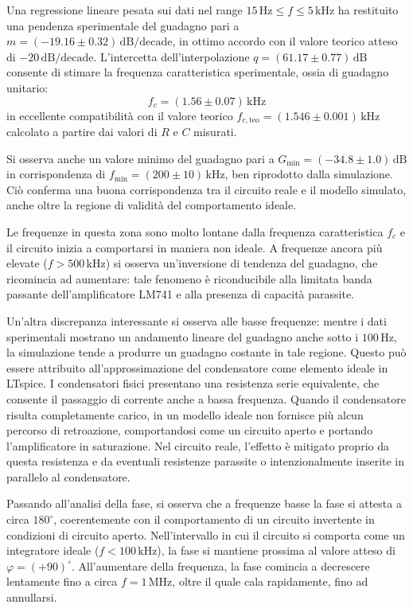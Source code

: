 \documentclass[a4paper,12pt]{article}
\begin{document}
Una regressione lineare pesata sui dati nel range \(15\,\mathrm{Hz} \leq f \leq 5\,\mathrm{kHz}\) ha restituito una pendenza sperimentale del guadagno pari a \(m = (-19.16 \pm 0.32)\,\mathrm{dB/decade}\), in ottimo accordo con il valore teorico atteso di \(-20\,\mathrm{dB/decade}\). L'intercetta dell'interpolazione \(q = (61.17 \pm 0.77)\,\mathrm{dB}\) consente di stimare la frequenza caratteristica sperimentale, ossia di guadagno unitario:
\[
f_c = (1.56 \pm 0.07)\,\mathrm{kHz}
\]
in eccellente compatibilità con il valore teorico \(f_{c,\mathrm{teo}} = (1.546 \pm 0.001)\,\mathrm{kHz}\) calcolato a partire dai valori di \(R\) e \(C\) misurati.

Si osserva anche un valore minimo del guadagno pari a \(G_{\min} = (-34.8 \pm 1.0)\,\mathrm{dB}\) in corrispondenza di \(f_{\min} = (200 \pm 10)\,\mathrm{kHz}\), ben riprodotto dalla simulazione. Ciò conferma una buona corrispondenza tra il circuito reale e il modello simulato, anche oltre la regione di validità del comportamento ideale.

Le frequenze in questa zona sono molto lontane dalla frequenza caratteristica \(f_c\) e il circuito inizia a comportarsi in maniera non ideale. A frequenze ancora più elevate (\(f > 500\,\mathrm{kHz}\)) si osserva un'inversione di tendenza del guadagno, che ricomincia ad aumentare: tale fenomeno è riconducibile alla limitata banda passante dell'amplificatore LM741 e alla presenza di capacità parassite.

Un'altra discrepanza interessante si osserva alle basse frequenze: mentre i dati sperimentali mostrano un andamento lineare del guadagno anche sotto i \(100\,\mathrm{Hz}\), la simulazione tende a produrre un guadagno costante in tale regione. Questo può essere attribuito all'approssimazione del condensatore come elemento ideale in LTspice. I condensatori fisici presentano una resistenza serie equivalente, che consente il passaggio di corrente anche a bassa frequenza. Quando il condensatore risulta completamente carico, in un modello ideale non fornisce più alcun percorso di retroazione, comportandosi come un circuito aperto e portando l’amplificatore in saturazione. Nel circuito reale, l’effetto è mitigato proprio da questa resistenza e da eventuali resistenze parassite o intenzionalmente inserite in parallelo al condensatore.

Passando all’analisi della fase, si osserva che a frequenze basse la fase si attesta a circa \(180^\circ\), coerentemente con il comportamento di un circuito invertente in condizioni di circuito aperto. Nell'intervallo in cui il circuito si comporta come un integratore ideale (\(f < 100\,\mathrm{kHz}\)), la fase si mantiene prossima al valore atteso di \(\varphi = (+90)^\circ\). All’aumentare della frequenza, la fase comincia a decrescere lentamente fino a circa \(f = 1\,\mathrm{MHz}\), oltre il quale cala rapidamente, fino ad annullarsi.
\end{document}
